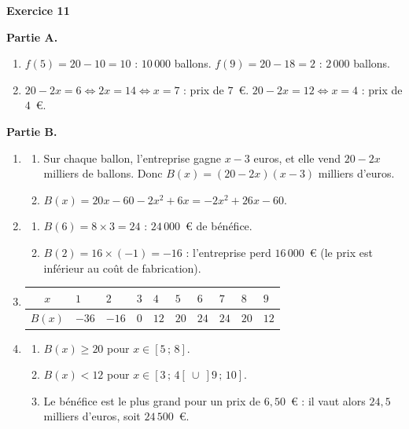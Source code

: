 \documentclass[a4paper,11pt]{article}
\newenvironment{exercice}[1]{%
  \Needspace{6\baselineskip}\par\bigskip\noindent\textbf{Exercice #1}\par\smallskip\noindent\ignorespaces
}{%
  \par
}
\begin{document}
\begin{exercice}{11}
\textbf{Partie A.}
\begin{enumerate}[label=\arabic*.]
  \item $f(5) = 20 - 10 = 10$ : $10\,000$ ballons. \quad $f(9) = 20 - 18 = 2$ : $2\,000$ ballons.
  \item $20 - 2x = 6 \iff 2x = 14 \iff x = 7$ : prix de $7$~€. \quad $20 - 2x = 12 \iff x = 4$ : prix de $4$~€.
\end{enumerate}

\textbf{Partie B.}
\begin{enumerate}[label=\arabic*.]
  \item \begin{enumerate}[label=\alph*.]
    \item Sur chaque ballon, l'entreprise gagne $x - 3$ euros, et elle vend $20 - 2x$ milliers de ballons. Donc $B(x) = (20 - 2x)(x - 3)$ milliers d'euros.
    \item $B(x) = 20x - 60 - 2x^2 + 6x = -2x^2 + 26x - 60$.
  \end{enumerate}
  \item \begin{enumerate}[label=\alph*.]
    \item $B(6) = 8 \times 3 = 24$ : $24\,000$~€ de bénéfice.
    \item $B(2) = 16 \times (-1) = -16$ : l'entreprise perd $16\,000$~€ (le prix est inférieur au coût de fabrication).
  \end{enumerate}
  \item
  \renewcommand{\arraystretch}{1.5}
  \begin{tabular}{|c|*{9}{C{1cm}|}}
    \hline
    $x$ & $1$ & $2$ & $3$ & $4$ & $5$ & $6$ & $7$ & $8$ & $9$ \\ \hline
    $B(x)$ & $-36$ & $-16$ & $0$ & $12$ & $20$ & $24$ & $24$ & $20$ & $12$ \\ \hline
  \end{tabular}
  \item \begin{enumerate}[label=\alph*.]
    \item $B(x) \geqslant 20$ pour $x \in [5\,;\,8]$.
    \item $B(x) < 12$ pour $x \in [3\,;\,4[\ \cup\ ]9\,;\,10]$.
    \item Le bénéfice est le plus grand pour un prix de $6{,}50$~€ : il vaut alors $24{,}5$ milliers d'euros, soit $24\,500$~€.
  \end{enumerate}
\end{enumerate}
\end{exercice}
\end{document}
